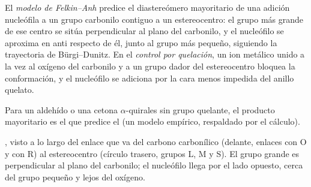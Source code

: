 \begin{definition}\label{def:b3:asymmetric-synthesis:felkin}
El \emph{modelo de Felkin--Anh} predice el diastereómero
mayoritario de una adición nucleófila a un grupo carbonilo contiguo a un
estereocentro: el grupo más grande de ese centro se sitúa perpendicular al
plano del carbonilo, y el nucleófilo se aproxima en anti respecto de él, junto al grupo
más pequeño, siguiendo la trayectoria de Bürgi--Dunitz. En el \emph{control
por quelación}, un ion metálico unido a la vez al oxígeno del carbonilo
y a un grupo dador del estereocentro bloquea la conformación, y el
nucleófilo se adiciona por la cara menos impedida del anillo quelato.
\end{definition}

\begin{proposition}\label{prop:b3:asymmetric-synthesis:felkin}
Para un aldehído o una cetona $\alpha$-quirales sin grupo quelante, el producto
mayoritario es el que predice el  (un modelo empírico,
respaldado por el cálculo). \admitted
\end{proposition}

\begin{omfigure}

{\small {}, visto a lo largo del enlace que va del carbono carbonílico (delante,
enlaces con O y con R) al estereocentro (círculo trasero, grupos L, M y S). El
grupo grande es perpendicular al plano del carbonilo; el nucleófilo llega por
el lado opuesto, cerca del grupo pequeño y lejos del oxígeno.}
\end{omfigure}


